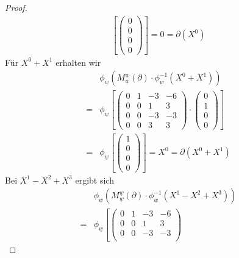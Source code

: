 \documentclass{article}
\begin{document}
\begin{enumerate}[(a)]
\begin{enumerate}[1.)]
\begin{proof}
\begin{align*}
                    \left[\begin{pmatrix}0 \\ 0 \\ 0 \\ 0\end{pmatrix}\right]
                    = 0 = \partial(X^0)
            \end{align*}
            Für $X^0 + X^1$ erhalten wir
            \begin{align*}
                &\phi_{\underline{w}}(M_{\underline{w}}^{\underline{w}} (\partial) \cdot \phi_{\underline{w}}^{-1}(X^0 + X^1))\\
                =&\phi_{\underline{w}}
                    \left[
                    \begin{pmatrix}
                        0 & 1 & -3 & -6\\
                        0 & 0 & 1 & 3\\
                        0 & 0 & -3 & -3\\
                        0 & 0 & 3 & 3
                    \end{pmatrix} \cdot 
                    \begin{pmatrix}0 \\ 1 \\ 0 \\ 0\end{pmatrix}
                    \right]\\
                =&\phi_{\underline{w}}
                    \left[\begin{pmatrix}1 \\ 0 \\ 0 \\ 0\end{pmatrix}\right]
                    = X^0 = \partial(X^0 + X^1)
            \end{align*}
            Bei $X^1 - X^2 + X^3$ ergibt sich
            \begin{align*}
                &\phi_{\underline{w}}(M_{\underline{w}}^{\underline{w}} (\partial) \cdot \phi_{\underline{w}}^{-1}(X^1-X^2+X^3))\\
                =&\phi_{\underline{w}}
                    \left[
                    \begin{pmatrix}
                        0 & 1 & -3 & -6\\
                        0 & 0 & 1 & 3\\
                        0 & 0 & -3 & -3\\

\end{pmatrix}
\end{align*}
\end{proof}
\end{enumerate}
\end{enumerate}
\end{document}
